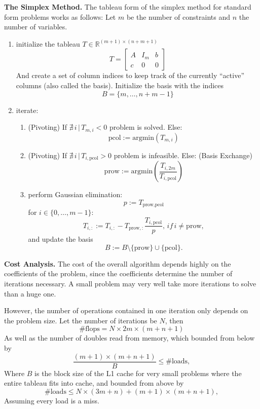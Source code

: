 \documentclass[letterpaper]{article}
\newcommand{\mypar}[1]{{\bf #1.}}
\begin{document}
\mypar{The Simplex Method}
The tableau form of the simplex method for standard form problems works as follows:
Let $m$ be the number of constraints and $n$ the number of variables.
\begin{enumerate}
    \item initialize the tableau $T \in \mathbb{R}^{(m+1) \times (n+m+1)}$
        \[ T = 
            \left[
            \begin{matrix}
                A & I_m & b \\
                c & 0 & 0
            \end{matrix}
            \right]
        \]
        And create a set of column indices to keep track of the currently ``active'' columns (also called the basis). 
        Initialize the basis with the indices 
        \[ B = \{ m, \dots, n+m-1 \} \]
    \item iterate:
        \begin{enumerate}
            \item (Pivoting) If $\nexists\, i\, |\, T_{m,i} < 0$ problem is solved. Else:
                \[\text{pcol} := \text{argmin}\left(T_{m,i}\right)\]
            \item (Pivoting) If $\nexists\, i\, |\, T_{i, \text{pcol}} > 0$ problem is infeasible. Else:
                (Basis Exchange)\[\text{prow} := \text{argmin}\left(\frac{T_{i, 2m}}{T_{i,\text{pcol}}} \right)\]
            \item perform Gaussian elimination:
                \[p :=  T_{\text{prow}, \text{pcol}}\]
                for $i \in \{0, \dots, m-1\}$:
                \[ T_{i,:} := T_{i,:} - T_{\text{prow},:} \frac{T_{i,\text{pcol}}}{p},\, if\, i \neq \text{prow}, \]
                and update the basis
                \[ B := B \setminus \{\text{prow}\} \cup \{\text{pcol}\}. \]
        \end{enumerate}
\end{enumerate}

\mypar{Cost Analysis}
The cost of the overall algorithm depends highly on the coefficients of the problem,
since the coefficients determine the number of iterations necessary. 
A small problem may very well take more iterations to solve than a huge one.

However, the number of operations contained in one iteration only depends on the problem size.
Let the number of iterations be $N$, then
\[ \text{\#flops} = N \times 2 m \times (m + n + 1) \]
As well as the number of doubles read from memory, which bounded from below by
\[ \frac{(m + 1) \times (m + n + 1)}{B} \leq \text{\#loads}, \]
Where $B$ is the block size of the L1 cache for very small problems where the entire
tableau fits into cache, and bounded from above by
\[ \text{\#loads} \leq N \times (3m + n) + (m + 1) \times (m + n + 1), \]
Assuming every load is a miss.
\end{document}
